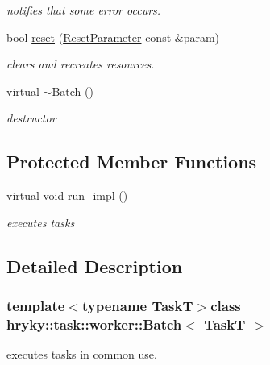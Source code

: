 \begin{DoxyCompactItemize}
\begin{DoxyCompactList}\small\item\em notifies that some error occurs. \end{DoxyCompactList}\item 
bool \hyperlink{group__task_ga88b1f6b27be23acb9fd42203d7cd3933}{reset} (\hyperlink{structhryky_1_1task_1_1worker_1_1_base_1_1_reset_parameter}{Reset\-Parameter} const \&param)
\begin{DoxyCompactList}\small\item\em clears and recreates resources. \end{DoxyCompactList}\item 
virtual \hyperlink{group__task_ga11956032bccdfa3a83ec3615f9c03d0f}{$\sim$\-Batch} ()
\begin{DoxyCompactList}\small\item\em destructor \end{DoxyCompactList}\end{DoxyCompactItemize}
\subsection*{Protected Member Functions}
\begin{DoxyCompactItemize}
\item 
virtual void \hyperlink{group__task_ga1f7366c2252fb0c7a7c8dc6f92a31e88}{run\-\_\-impl} ()
\begin{DoxyCompactList}\small\item\em executes tasks \end{DoxyCompactList}\end{DoxyCompactItemize}


\subsection{Detailed Description}
\subsubsection*{template$<$typename Task\-T$>$class hryky\-::task\-::worker\-::\-Batch$<$ Task\-T $>$}

executes tasks in common use. 

